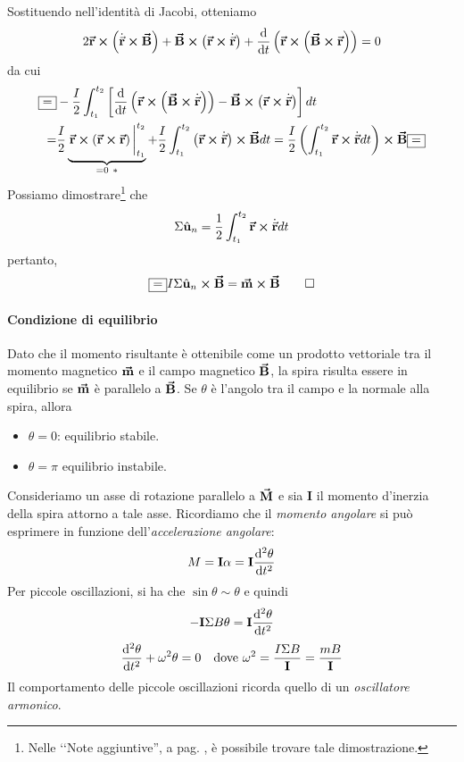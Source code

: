 \begin{demonstration}
	Sostituendo nell'identità di Jacobi, otteniamo
	\begin{equation*}
		2\vb*{\va{r}}\cross\left(\dot{\vec{\mathbf{r}}}\cross\vb*{\va{B}}\right)+\vb*{\va{B}}\cross\left(\vb*{\va{r}}\cross\dot{\vec{\mathbf{r}}}\right)+\dv{t}\left(\vb*{\va{r}}\cross\left(\vb*{\va{B}}\cross\vb*{\va{r}}\right)\right)=0
	\end{equation*}
	da cui
	\begin{align*}
		\squarequal& -\frac{I}{2}\int_{t_1}^{t_2}\left[\dv{t}\left(\vba{r}\cross\left(\vba{B}\cross\vbd{r}\right)\right)-\vba{B}\cross\left(\vba{r}\cross\vbd{r}\right)\right]dt\\
		=&\frac{I}{2}\underbrace{\eval{\vba{r}\cross\left(\vba{r}\cross\vba{r}\right)}_{t_1}^{t_2}}_{=0\ \ast}+\frac{I}{2}\int_{t_1}^{t_2}\left(\vba{r}\cross\vbd{r}\right)\cross\vba{B}dt=\frac{I}{2}\left(\int_{t_1}^{t_2}\vba{r}\cross\vbd{r}dt\right)\cross\vba{B}\squarequal
	\end{align*}
	Possiamo dimostrare\footnote{Nelle ‘‘Note aggiuntive'', a pag. \pageref{AreaCurvaDelimitata}, è possibile trovare tale dimostrazione.} che
	\begin{equation*}
		\Sigma\hat{\mathbf{u}}_n=\frac{1}{2}\int_{t_1}^{t_2}\vb*{\va{r}}\cross\dot{\vec{\mathbf{r}}}dt
	\end{equation*}
pertanto,
\begin{equation*}
	\squarequal I\Sigma\vbh{u}_n\cross \vba{B}=\vba{m}\cross\vba{B}\qedhere
\end{equation*}
\end{demonstration}
\paragraph{Condizione di equilibrio}
Dato che il momento risultante è ottenibile come un prodotto vettoriale tra il momento magnetico $\vb*{\va{m}}$ e il campo magnetico $\vb*{\va{B}}$, la spira risulta essere in equilibrio se $\vb*{\va{m}}$ è parallelo a $\vb*{\va{B}}$. Se $\theta$ è l'angolo tra il campo e la normale alla spira, allora
\begin{itemize}
	\item $\theta = 0$: equilibrio stabile.
	\item $\theta = \pi$ equilibrio instabile.
\end{itemize}
Consideriamo un asse di rotazione parallelo a $\vb*{\va{M}}$ e sia $\mathbf{I}$ il momento d'inerzia della spira attorno a tale asse. Ricordiamo che il \textit{momento angolare} si può esprimere in funzione dell'\textit{accelerazione angolare}:
\begin{equation}
	M=\mathbf{I}\alpha=\mathbf{I}\dv[2]{\theta}{t}
\end{equation}
Per piccole oscillazioni, si ha che $\sin\theta\sim\theta$ e quindi
\begin{equation*}
	-\mathbf{I}\Sigma B\theta=\mathbf{I}\dv[2]{\theta}{t}
\end{equation*}
\begin{align}
	\dv[2]{\theta}{t}+\omega^2\theta=0\quad\text{dove}\ \omega^2=\frac{I\Sigma B}{\mathbf{I}}=\frac{m B}{\mathbf{I}}
\end{align}
Il comportamento delle piccole oscillazioni ricorda quello di un \textit{oscillatore armonico}.
